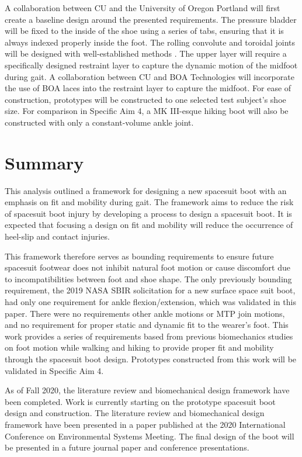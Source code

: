 \documentclass[defaultstyle,11pt]{comps}
\begin{document}
A collaboration between CU and the University of Oregon Portland will first create a baseline design around the presented requirements.
The pressure bladder will be fixed to the inside of the shoe using a series of tabs, ensuring that it is always indexed properly inside the foot.
The rolling convolute and toroidal joints will be designed with well-established methods \citep{Harris2001}.
The upper layer will require a specifically designed restraint layer to capture the dynamic motion of the midfoot during gait.
A collaboration between CU and BOA Technologies will incorporate the use of BOA laces into the restraint layer to capture the midfoot.
For ease of construction, prototypes will be constructed to one selected test subject's shoe size.
For comparison in Specific Aim 4, a MK III-esque hiking boot will also be constructed with only a constant-volume ankle joint.

\hypertarget{summary-4}{%
\section{Summary}\label{summary-4}}

This analysis outlined a framework for designing a new spacesuit boot with an emphasis on fit and mobility during gait.
The framework aims to reduce the risk of spacesuit boot injury by developing a process to design a spacesuit boot.
It is expected that focusing a design on fit and mobility will reduce the occurrence of heel-slip and contact injuries.

This framework therefore serves as bounding requirements to ensure future spacesuit footwear does not inhibit natural foot motion or cause discomfort due to incompatibilities between foot and shoe shape.
The only previously bounding requirement, the 2019 NASA SBIR solicitation for a new surface space suit boot, had only one requirement for ankle flexion/extension, which was validated in this paper.
There were no requirements other ankle motions or MTP join motions, and no requirement for proper static and dynamic fit to the wearer's foot.
This work provides a series of requirements based from previous biomechanics studies on foot motion while walking and hiking to provide proper fit and mobility through the spacesuit boot design.
Prototypes constructed from this work will be validated in Specific Aim 4.

As of Fall 2020, the literature review and biomechanical design framework have been completed.
Work is currently starting on the prototype spacesuit boot design and construction.
The literature review and biomechanical design framework have been presented in a paper published at the 2020 International Conference on Environmental Systems Meeting.
The final design of the boot will be presented in a future journal paper and conference presentations.
\end{document}
